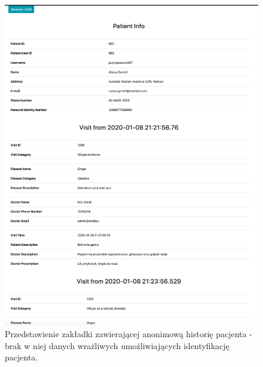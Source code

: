 \begin{figure}[H]
\centering
\includegraphics[width=15cm]{pictures/service/09-history_normal}
\caption{Przedstawienie zakładki zawierającej anonimową historię pacjenta - brak w niej danych wrażliwych umożliwiających identyfikację pacjenta.}
\label{history_pic}
\end{figure}

